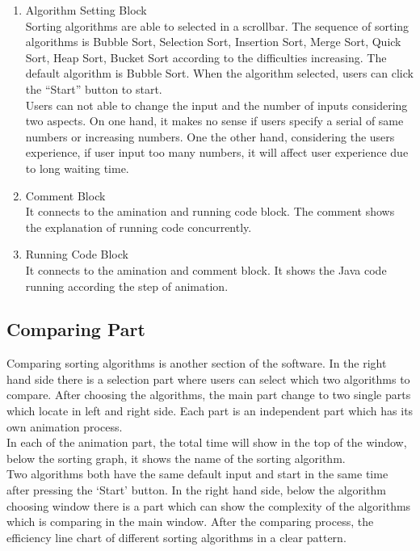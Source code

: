 \documentclass[paper=a4, fontsize=11pt,twoside]{scrartcl}		%
\begin{document}
\begin{enumerate}
\item Algorithm Setting Block \\
Sorting algorithms are able to selected in a scrollbar. The sequence of sorting algorithms is Bubble Sort, Selection Sort, Insertion Sort, Merge Sort, Quick Sort, Heap Sort, Bucket Sort according to the difficulties increasing. The default algorithm is Bubble Sort. When the algorithm selected, users can click the “Start” button to start. \\
Users can not able to change the input and the number of inputs considering two aspects. On one hand, it makes no sense if users specify a serial of same numbers or increasing numbers. One the other hand, considering the users experience, if user input too many numbers, it will affect user experience due to long waiting time. 

\item Comment Block \\It connects to the amination and running code block. The comment shows the explanation of running code concurrently. 

\item Running Code Block \\It connects to the amination and comment block. It shows the Java code running according the step of animation.
\end{enumerate}


\subsection{Comparing Part}

Comparing sorting algorithms is another section of the software. In the right hand side there is a selection part where users can select which two algorithms to compare. After choosing the algorithms, the main part change to two single parts which locate in left and right side. Each part is an independent part which has its own animation process.\\

In each of the animation part, the total time will show in the top of the window, below the sorting graph, it shows the name of the sorting algorithm.\\

Two algorithms both have the same default input and start in the same time after pressing the ‘Start’ button. In the right hand side, below the algorithm choosing window there is a part which can show the complexity of the algorithms which is comparing in the main window. After the comparing process, the efficiency line chart of different sorting algorithms in a clear pattern.\\
\end{document}

